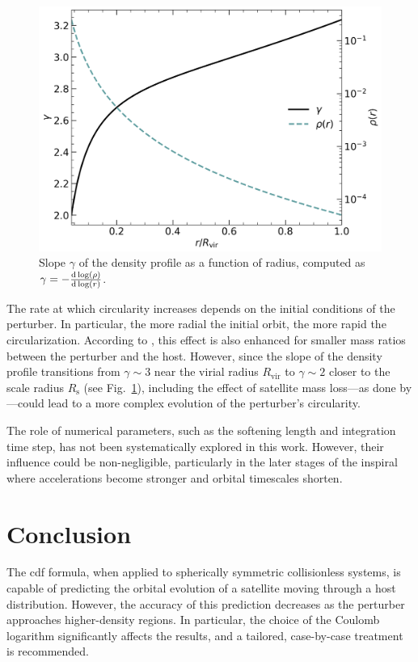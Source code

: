 \documentclass[twocolumn, a4paper]{article}
\begin{document}
\begin{figure}
    \centering
    \includegraphics[width=\columnwidth]{images/rho_gamma.png}
    \caption{Slope \(\gamma\) of the density profile as a function of radius, computed as \(\gamma = -\dv{\log(\rho)}{\log(r)}\).}
    \label{fig:rho_gamma}
\end{figure}

The rate at which circularity increases depends on the initial conditions of the perturber. In particular, the more radial the initial orbit, the more rapid the circularization. According to \citeauthor{Vasiliev2022}, this effect is also enhanced for smaller mass ratios between the perturber and the host. However, since the slope of the density profile transitions from \(\gamma \sim 3\) near the virial radius \(R_\text{vir}\) to \(\gamma \sim 2\) closer to the scale radius \(R_\text{s}\) (see Fig.~\ref{fig:rho_gamma}), including the effect of satellite mass loss—as done by \citeauthor{Vasiliev2022}—could lead to a more complex evolution of the perturber’s circularity.

The role of numerical parameters, such as the softening length and integration time step, has not been systematically explored in this work. However, their influence could be non-negligible, particularly in the later stages of the inspiral where accelerations become stronger and orbital timescales shorten.

\section{Conclusion}

The \acrlong{cdf} formula, when applied to spherically symmetric collisionless systems, is capable of predicting the orbital evolution of a satellite moving through a host distribution. However, the accuracy of this prediction decreases as the perturber approaches higher-density regions. In particular, the choice of the Coulomb logarithm significantly affects the results, and a tailored, case-by-case treatment is recommended.
\end{document}
